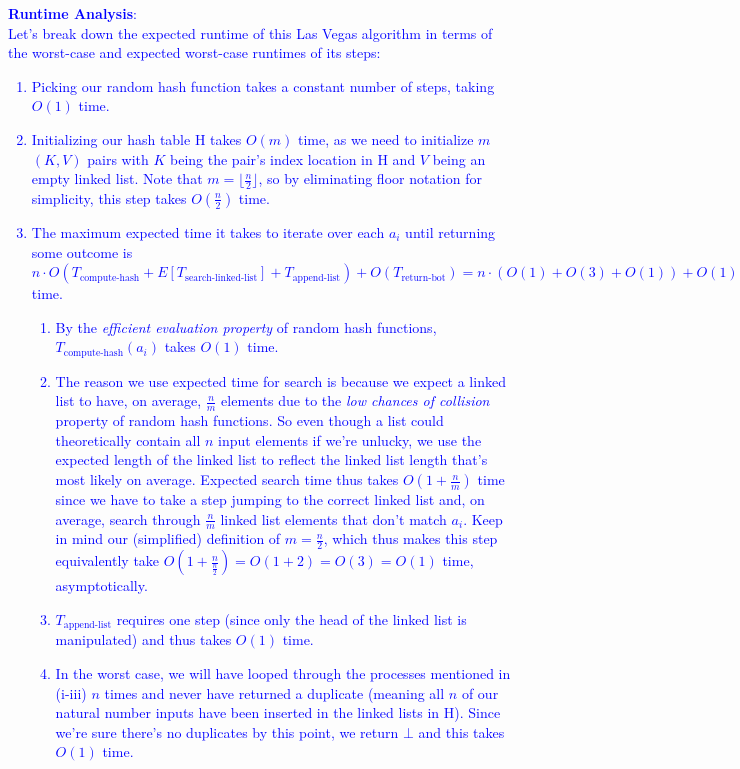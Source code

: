 \documentclass[11pt]{article}
\begin{document}
\begin{enumerate}
\begin{enumerate}
\textcolor{blue}{
    \textbf{Runtime Analysis}: \\
    Let's break down the expected runtime of this Las Vegas algorithm in terms of the worst-case and expected worst-case runtimes of its steps:
    \begin{enumerate}
        \item Picking our random hash function takes a constant number of steps, taking $O(1)$ time.
        \item Initializing our hash table H takes $O(m)$ time, as we need to initialize $m$ $(K,V)$ pairs with $K$ being the pair's index location in H and $V$ being an empty linked list. Note that $m = \lfloor \frac{n}{2} \rfloor$, so by eliminating floor notation for simplicity, this step takes $O(\frac{n}{2})$ time.
        \item The maximum expected time it takes to iterate over each $a_i$ until returning some outcome is $n \cdot O(T_{\text{compute-hash}} + E[T_{\text{search-linked-list}}] + T_{\text{append-list}}) + O(T_{\text{return-bot}}) = n \cdot(O(1) + O(3) + O(1)) + O(1) = n \cdot(O(1) + O(1) + O(1)) + O(1) = n \cdot O(1) + O(1) = O(n+1) = O(n)$ time.
        \begin{enumerate}
            \item By the \textit{efficient evaluation property} of random hash functions, $T_{\text{compute-hash}}(a_i)$ takes $O(1)$ time.
            \item The reason we use expected time for search is because we expect a linked list to have, on average, $\frac{n}{m}$ elements due to the \textit{low chances of collision} property of random hash functions. So even though a list could theoretically contain all $n$ input elements if we're unlucky, we use the expected length of the linked list to reflect the linked list length that's most likely on average. Expected search time thus takes $O(1 + \frac{n}{m})$ time since we have to take a step jumping to the correct linked list and, on average, search through $\frac{n}{m}$ linked list elements that don't match $a_i$. Keep in mind our (simplified) definition of $m = \frac{n}{2}$, which thus makes this step equivalently take $O(1 + \frac{n}{\frac{n}{2}}) = O(1+2) = O(3) = O(1)$ time, asymptotically.
            \item $T_{\text{append-list}}$ requires one step (since only the head of the linked list is manipulated) and thus takes $O(1)$ time.
            \item In the worst case, we will have looped through the processes mentioned in (i-iii) $n$ times and never have returned a duplicate (meaning all $n$ of our natural number inputs have been inserted in the linked lists in H). Since we're sure there's no duplicates by this point, we return $\bot$ and this takes $O(1)$ time.

\end{enumerate}
\end{enumerate}}
\end{enumerate}
\end{enumerate}
\end{document}

